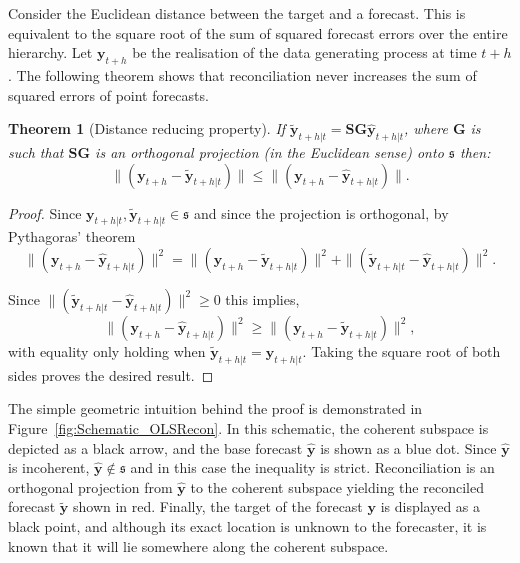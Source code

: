 \documentclass[12pt]{article}
\newtheorem{theo}{Theorem}[section]
\theoremstyle{definition}
\begin{document}
Consider the Euclidean distance between the target and a forecast. This is equivalent to the square root of the sum of squared forecast errors over the entire hierarchy. Let $\bm{y}_{t+h}$ be the realisation of the data generating process at time $t+h$. The following theorem shows that reconciliation never increases the sum of squared errors of point forecasts.

\begin{theo}[Distance reducing property]\label{th:distred}
  If $\tilde{\bm{y}}_{t+h|t}=\bm{S}\bm{G}\hat{\bm{y}}_{t+h|t}$, where $\bm{G}$ is such that $\bm{S}\bm{G}$ is an orthogonal projection (in the Euclidean sense) onto $\mathfrak{s}$ then:
  \begin{equation*}
    \|(\bm{y}_{t+h}-\tilde{\bm{y}}_{t+h|t})\|\le\|(\bm{y}_{t+h}-\hat{\bm{y}}_{t+h|t})\|.
  \end{equation*}
\end{theo}
\begin{proof}
  Since $\bm{y}_{t+h|t},\tilde{\bm{y}}_{t+h|t}\in\mathfrak{s}$ and since the projection is orthogonal, by Pythagoras' theorem
  \begin{equation*} \|(\bm{y}_{t+h}-\hat{\bm{y}}_{t+h|t})\|^2=\|(\bm{y}_{t+h}-\tilde{\bm{y}}_{t+h|t})\|^2+\|(\tilde{\bm{y}}_{t+h|t}-\hat{\bm{y}}_{t+h|t})\|^2.
  \end{equation*}

  Since $\|(\tilde{\bm{y}}_{t+h|t}-\hat{\bm{y}}_{t+h|t})\|^2\ge 0$ this implies,
  \begin{equation*} \|(\bm{y}_{t+h}-\hat{\bm{y}}_{t+h|t})\|^2\ge\|(\bm{y}_{t+h}-\tilde{\bm{y}}_{t+h|t})\|^2,
  \end{equation*}
  with equality only holding when $\tilde{\bm{y}}_{t+h|t}=\hat{\bm{y}}_{t+h|t}$. Taking the square root of both sides proves the desired result.
\end{proof}

The simple geometric intuition behind the proof is demonstrated in Figure~\ref{fig:Schematic_OLSRecon}. In this schematic, the coherent subspace is depicted as a black arrow, and the base forecast $\hat{\bm{y}}$ is shown as a blue dot. Since $\hat{\bm{y}}$ is incoherent, $\hat{\bm{y}}\notin\mathfrak{s}$ and in this case the inequality is strict. Reconciliation is an orthogonal projection from $\hat{\bm{y}}$ to the coherent subspace yielding the reconciled forecast $\tilde{\bm{y}}$ shown in red. Finally, the target of the forecast $\bm{y}$ is displayed as a black point, and although its exact location is unknown to the forecaster, it is known that it will lie somewhere along the coherent subspace.
\end{document}
